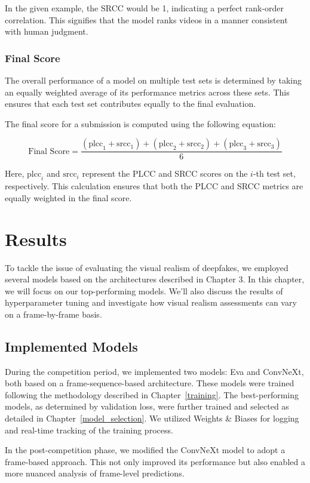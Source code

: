 \documentclass[a4paper,12pt,openright]{book}
\begin{document}
In the given example, the SRCC would be 1, indicating a perfect rank-order correlation. This signifies that the model ranks videos in a manner consistent with human judgment.

\subsection{Final Score}

The overall performance of a model on multiple test sets is determined by taking an equally weighted average of its performance metrics across these sets. This ensures that each test set contributes equally to the final evaluation.

The final score for a submission is computed using the following equation:

\[
\text{Final Score} = \frac{(\text{plcc}_1 + \text{srcc}_1) + (\text{plcc}_2 + \text{srcc}_2) + (\text{plcc}_3 + \text{srcc}_3)}{6}
\]


Here, \(\text{plcc}_i\) and \(\text{srcc}_i\) represent the PLCC and SRCC scores on the \(i\)-th test set, respectively. This calculation ensures that both the PLCC and SRCC metrics are equally weighted in the final score.


\chapter{Results}
\label{chap:results}
To tackle the issue of evaluating the visual realism of deepfakes, we employed several models based on the architectures described in Chapter 3. In this chapter, we will focus on our top-performing models. We'll also discuss the results of hyperparameter tuning and investigate how visual realism assessments can vary on a frame-by-frame basis.
\section{Implemented Models}
During the competition period, we implemented two models: Eva and ConvNeXt, both based on a frame-sequence-based architecture. These models were trained following the methodology described in Chapter~\ref{training}. The best-performing models, as determined by validation loss, were further trained and selected as detailed in Chapter~\ref{model_selection}. We utilized Weights \& Biases for logging and real-time tracking of the training process. 

In the post-competition phase, we modified the ConvNeXt model to adopt a frame-based approach. This not only improved its performance but also enabled a more nuanced analysis of frame-level predictions.
\end{document}
